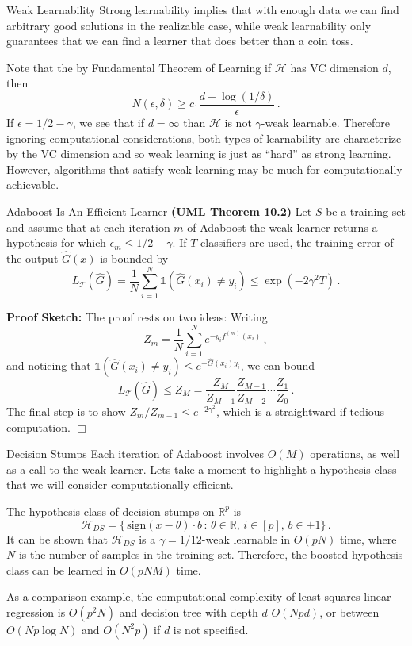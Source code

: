 \documentclass[10pt, table, dvipsnames, handout]{beamer}
\newcommand{\cT}{\ensuremath{\mathcal{T}}}
\newcommand{\cH}{\ensuremath{\mathcal{H}}}
\newcommand{\bR}{\ensuremath{\mathbb{R}}}
\begin{document}
\begin{frame}[fragile]{Weak Learnability}
Strong learnability implies that with enough data we can find arbitrary good solutions in the realizable case, while weak learnability only guarantees that we can find a learner that does better than a coin toss. \pause 

Note that the by Fundamental Theorem of Learning if $\cH$ has VC dimension $d$, then 
$$
N(\epsilon,\delta)\geq c_1\frac{d + \log(1/\delta)}{\epsilon}\,.
$$
If $\epsilon = 1/2 - \gamma$, we see that if $d=\infty$ than $\cH$ is not $\gamma$-weak learnable. Therefore ignoring computational considerations, both types of learnability are characterize by the VC dimension and so weak learning is just as ``hard'' as strong learning. \pause However, algorithms that satisfy weak learning may be much for computationally achievable. 
\end{frame}


\begin{frame}[fragile]{Adaboost Is An Efficient Learner}
\textbf{(UML Theorem 10.2)} Let $S$ be a training set and assume that at each iteration $m$ of Adaboost the weak learner returns a hypothesis for which $\epsilon_m\leq 1/2-\gamma$. \pause If $T$ classifiers are used, the training error of the output $\hat{G}(x)$ is bounded by
$$
L_{\cT}(\hat{G}) = \frac{1}{N}\sum_{i=1}^N \mathds{1}(\hat{G}(x_i)\neq y_i) \leq \exp(-2\gamma^2T)\,.
$$\pause

\textbf{Proof Sketch:} The proof rests on two ideas: Writing 
$$
Z_m = \frac{1}{N}\sum_{i=1}^N e^{-y_i f^{(m)}(x_i)}\,,
$$\pause
and noticing that $\mathds{1}(\hat{G}(x_i)\neq y_i) \leq e^{-\hat{G}(x_i) y_i}$, we can bound 
$$
L_{\cT}(\hat{G}) \leq Z_{M} = \frac{Z_M}{Z_{M-1}} \frac{Z_{M-1}}{Z_{M-2}}\cdots \frac{Z_1}{Z_{0}} \,.
$$\pause
The final step is to show $Z_m/Z_{m-1} \leq e^{-2\gamma^2}$, which is a straightward if tedious computation. \hfill $\Box$
\end{frame}




\begin{frame}[fragile]{Decision Stumps}
Each iteration of Adaboost involves $O(M)$ operations, as well as a call to the weak learner. Lets take a moment to highlight a hypothesis class that we will consider computationally efficient.\pause

The hypothesis class of decision stumps on $\bR^p$ is
$$
\cH_{DS} = \big\{\,\text{sign}(x-\theta)\cdot b\,:\,\theta\in \bR,\, i\in [p],\,b\in {\pm1}\big\}\,.
$$
It can be shown that $\cH_{DS}$ is a $\gamma = 1/12$-weak learnable in $O(pN)$ time, where $N$ is the number of samples in the training set. Therefore, the boosted hypothesis class can be learned in $O(pNM)$ time. \pause

As a comparison example, the computational complexity of least squares linear regression is $O(p^2N)$ and decision tree with depth $d$ $O(Npd)$, or between $O(Np\log N)$ and $O(N^2p)$ if $d$ is not specified. 
\end{frame}
\end{document}
